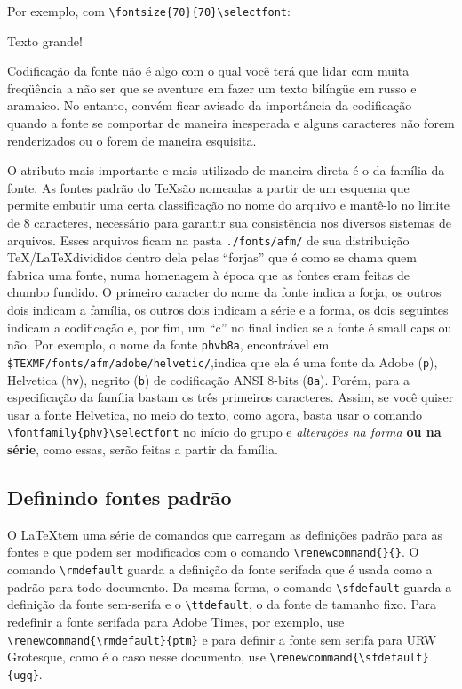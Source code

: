 \documentclass[a4paper,11pt]{scrartcl}
\renewcommand{\ttdefault}{cmtt}
\renewcommand{\sfdefault}{ugq}
\begin{document}
Por exemplo, com \verb!\fontsize{70}{70}\selectfont!:

{\fontsize{70}{70}\selectfont Texto grande!}
\vspace{2em}

Codificação da fonte não é algo com o qual
você terá que lidar com
muita freqüência a não ser que se aventure em fazer um texto bilíngüe
em russo e aramaico. No entanto,
convém ficar avisado da importância
da codificação quando a fonte se comportar de maneira inesperada e
alguns caracteres não forem renderizados ou o forem de maneira
esquisita.

O atributo mais importante e mais utilizado de maneira direta é o da
família da fonte. As fontes padrão
do \TeX são nomeadas a partir de um esquema que permite embutir uma
certa classificação no nome do arquivo e mantê-lo no limite de 8
caracteres, necessário para garantir sua consistência nos diversos
sistemas de arquivos. Esses arquivos ficam na pasta
\texttt{./fonts/afm/} de sua distribuição \TeX/\LaTeX divididos
dentro dela pelas ``forjas'' que é como se chama quem fabrica uma
fonte, numa homenagem à época que as fontes eram feitas de chumbo
fundido. O primeiro caracter do nome da fonte indica a forja, os
outros dois indicam a família, os outros dois indicam a série e a
forma, os dois seguintes indicam a codificação e, por fim, um ``c''
no final indica se a fonte é small caps ou não. Por exemplo, o nome
da fonte \texttt{phvb8a}, encontrável em
\texttt{\$TEXMF/fonts/afm/adobe/helvetic/},indica que ela é uma fonte
da Adobe (\texttt{p}), Helvetica (\texttt{hv}), negrito (\texttt{b})
de codificação ANSI 8-bits (\texttt{8a}). Porém, para a especificação
da família bastam os três primeiros caracteres. Assim, se você quiser
{\selectfont usar a fonte Helvetica, no meio do
texto, como agora, basta usar o comando
\verb!\fontfamily{phv}\selectfont! no início do grupo e
\emph{alterações na forma} \textbf{ou na série}, como essas, serão
feitas a partir da família.}



\subsection{Definindo fontes padrão}

O \LaTeX tem uma série de comandos que carregam as definições padrão
para as fontes e que podem ser modificados com o comando
\verb!\renewcommand{}{}!. O comando \verb!\rmdefault! guarda a
definição da fonte serifada que é usada como a padrão para todo
documento. Da mesma forma, o comando \verb!\sfdefault! guarda a
definição da fonte sem-serifa e o \verb!\ttdefault!, o da fonte de
tamanho fixo. Para redefinir a fonte serifada para Adobe Times, por
exemplo, use \verb!\renewcommand{\rmdefault}{ptm}! e para definir a
fonte sem serifa para URW Grotesque, como é o caso nesse documento,
use \verb!\renewcommand{\sfdefault}{ugq}!.
\end{document}
